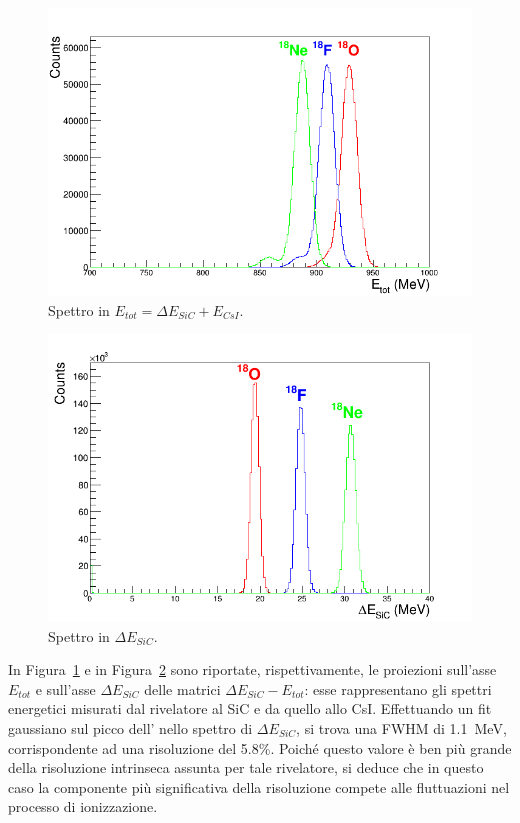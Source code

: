 \begin{figure} [!p]
	\centering
	\includegraphics[scale=0.5]{Grafici_Tesi/Particelle_monocromatiche/ETot.png}
	\caption{Spettro in $E_{tot} = \Delta E_{SiC} + E_{CsI}$.} \label{fig:ETot}
\end{figure}


\begin{figure} [!p]
	\centering
	\includegraphics[scale=0.5]{Grafici_Tesi/Particelle_monocromatiche/deltaE_Tot.png}
	\caption{Spettro in $ \Delta E_{SiC} $.} \label{fig:deltaE_Tot}
\end{figure}



In Figura~\ref{fig:ETot} e in Figura~\ref{fig:deltaE_Tot} sono riportate, rispettivamente, le proiezioni sull'asse $E_{tot}$ e sull'asse $\Delta E_{SiC}$ delle matrici $\Delta E_{SiC} - E_{tot}$: esse rappresentano gli spettri energetici misurati dal rivelatore al SiC e da quello allo CsI.
Effettuando un fit gaussiano sul picco dell' nello spettro di $\Delta E_{SiC}$, si trova una FWHM di 1.1~MeV, corrispondente ad una risoluzione del 5.8\%.
Poiché questo valore è ben più grande della risoluzione intrinseca assunta per tale rivelatore, si deduce che in questo caso la componente più significativa della risoluzione compete alle fluttuazioni nel processo di ionizzazione.











